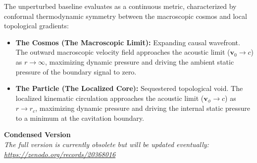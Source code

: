 \vspace{0.3cm}

\begin{tcolorbox}[cheatbox, title={The Conformal Duality of the Metric \scriptsize\hfill\hyperref[sec:part2]{[See Derivations $\downarrow$]}}]
The unperturbed baseline evaluates as a continuous metric, characterized by conformal thermodynamic symmetry between the macroscopic cosmos and local topological gradients: %
\begin{itemize}[leftmargin=*, nosep]
    \item \textbf{The Cosmos (The Macroscopic Limit):} Expanding causal wavefront. The outward macroscopic velocity field approaches the acoustic limit ($\mathbf{v}_0 \to c$) as $r \to \infty$, maximizing dynamic pressure and driving the ambient static pressure of the boundary signal to zero.
    \item \textbf{The Particle (The Localized Core):} Sequestered topological void. The localized kinematic circulation approaches the acoustic limit ($\mathbf{v}_{\phi} \to c$) as $r \to r_c$, maximizing dynamic pressure and driving the internal static pressure to a minimum at the cavitation boundary. %
\end{itemize}
\end{tcolorbox}

\vspace{4cm}


\begin{center}
    \LARGE\textbf{Condensed Version}\\ 
    \vspace{1cm}
    \small\textit{The full version is currently obsolete but will be updated eventually:  \\ \hyperlink{https://zenodo.org/records/20368016}{https://zenodo.org/records/20368016}}
\end{center}



